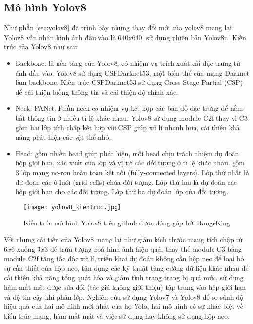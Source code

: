 \documentclass[../the.tex]{subfiles}
\begin{document}
\subsection{Mô hình Yolov8}
{\fontsize{13}{12} \selectfont 
Như phần \ref{sec:yolov8} đã trình bày những thay đổi mới của yolov8 mang lại. Yolov8 vẫn nhận hình ảnh đầu vào là 640x640, sử dụng phiên bản Yolov8n. Kiến trúc của Yolov8 như sau:
\begin{itemize}
	\item Backbone: là nền tảng của Yolov8, có nhiệm vụ trích xuất cái đặc trưng từ ảnh đầu vào. Yolov8 sử dụng CSPDarknet53, một biến thể của mạng Darknet làm backbone. 
	Kiến trúc CSPDarknet53 sử dụng Cross-Stage Partial (CSP) để cải thiện luồng thông tin và cải thiện độ chính xác.
	\item Neck: PANet. Phần neck có nhiệm vụ kết hợp các bản đồ đặc trưng để nắm bắt thông tin ở nhiều tỉ lệ khác nhau. Yolov8 sử dụng module C2f thay vì C3 gồm hai lớp tích chập kết hợp với CSP giúp xử lí nhanh hơn, cải thiện khả năng phát hiện các vật thể nhỏ.
	\item Head: gồm nhiều head giúp phát hiện, mỗi head chịu trách nhiệm dự đoán hộp giới hạn, xác xuất của lớp và vị trí các đối tượng ở tỉ lệ  khác nhau.
	gồm 3 lớp mạng nơ-ron hoàn toàn kết nối
	(fully-connected layers). Lớp thứ nhất
	là dự đoán các ô lưới (grid cells) chứa đối
	tượng. Lớp thứ hai là dự đoán các hộp giới hạn cho các đối tượng. Lớp thứ ba dự đoán lớp của đối tượng.
\end{itemize}
\bigskip
}

\begin{figure}[H]
	\centering
	\texttt{[image: yolov8\_kientruc.jpg]}
	\caption{Kiến trúc mô hình Yolov8 trên github được đóng góp bởi RangeKing}
	\label{fig:yolo8_kientruc}
\end{figure}


{\fontsize{13}{12} \selectfont 
Với nhưng cải tiến của Yolov8 mang lại như giảm kích thước mạng tích chập từ $6x6$ xuống $3x3$ để trừu tượng hoá hình ảnh hiệu quả, thay thế module C3 bằng module C2f tăng tốc độc xử lí, triển khai dự đoán không cần hộp neo để loại bỏ sự cần thiết của hộp neo,
tận dụng các kỹ thuật tăng cường dữ liệu khác nhau để cải thiện khả năng tổng quát hóa và giảm tình trạng trang bị quá mức, sử dụng hàm mất mát được sửa đổi (tác giả không giới thiệu) tập trung vào hộp giới hạn và độ tin cậy khi phân lớp. 
Nghiên cứu sử dụng Yolov7 và Yolov8 để so sánh độ hiệu quả của hai mô hình mới nhất của họ Yolo, hai mô hình có sự khác biệt về kiến trúc mạng, hàm mất mát và việc sử dụng hay không sử dụng hộp neo.
}
\end{document}
